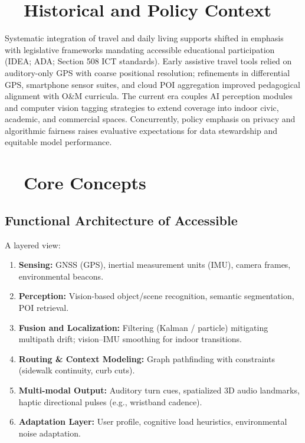 \section{~~Historical and Policy Context}\label{ch8:sec:history-policy}
Systematic integration of travel and daily living supports shifted in emphasis with legislative frameworks mandating accessible educational participation (IDEA\supercite{IDEA2004}; ADA\supercite{ADA1990}; Section 508 ICT standards\supercite{Section508, USAccessBoard2018}). Early assistive travel tools relied on auditory-only GPS with coarse positional resolution; refinements in differential GPS, smartphone sensor suites, and cloud POI aggregation improved pedagogical alignment with O\&M curricula.\supercite{AFBGPS2023, OrientationMobilityInstruction} The current era couples AI perception modules and computer vision tagging strategies to extend coverage into indoor civic, academic, and commercial spaces.\supercite{navilens, msseeingai, bipedai} Concurrently, policy emphasis on privacy and algorithmic fairness raises evaluative expectations for data stewardship and equitable model performance.\supercite{DataPrivacyAI, AI_Ethics_Bias}

\section{~~Core Concepts}\label{ch8:sec:core-concepts}

\subsection{Functional Architecture of Accessible }
A layered view:
\begin{enumerate}
	\item \textbf{Sensing:} GNSS (GPS), inertial measurement units (IMU), camera frames, environmental beacons.
	\item \textbf{Perception:} Vision-based object/scene recognition, semantic segmentation, POI retrieval.\supercite{msseeingai, envision}
	\item \textbf{Fusion and Localization:} Filtering (Kalman / particle) mitigating multipath drift; vision–IMU smoothing for indoor transitions.\supercite{bipedai}
	\item \textbf{Routing \& Context Modeling:} Graph pathfinding with  constraints (sidewalk continuity, curb cuts).
	\item \textbf{Multi-modal Output:} Auditory turn cues, spatialized 3D audio landmarks, haptic directional pulses (e.g., wristband cadence).\supercite{WeWALK}
	\item \textbf{Adaptation Layer:} User profile, cognitive load heuristics, environmental noise adaptation.
\end{enumerate}

